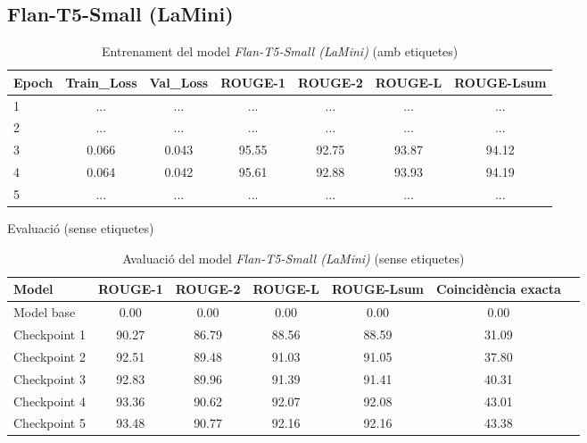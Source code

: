 \subsection{Flan-T5-Small (LaMini)}
\begin{table}[H]
    \centering
    \begin{tabular}{lcccccc}
    \toprule
    Epoch & Train\_Loss & Val\_Loss & ROUGE-1 & ROUGE-2 & ROUGE-L & ROUGE-Lsum \\
    \midrule
    1 & ... & ... & ... & ... & ... & ... \\
    2 & ... & ... & ... & ... & ... & ... \\
    3 & 0.066 & 0.043 & 95.55 & 92.75 & 93.87 & 94.12 \\
    4 & 0.064 & 0.042 & 95.61 & 92.88 & 93.93 & 94.19 \\
    5 & ... & ... & ... & ... & ... & ... \\
    \bottomrule
    \end{tabular}
    \caption[Entrenament del model \textit{Flan-T5-Small (LaMini)}]{Entrenament del model \textit{Flan-T5-Small (LaMini)} (amb etiquetes)}
\end{table}

\begin{table}[H]
    \centering
    \caption{Evaluació (sense etiquetes)}
    \begin{tabular}{lcccccc}
    \toprule
    Model & ROUGE-1 & ROUGE-2 & ROUGE-L & ROUGE-Lsum & Coincidència exacta \\
    \midrule
    Model base & 0.00 & 0.00 & 0.00 & 0.00 & 0.00 \\
    Checkpoint 1 & 90.27 & 86.79 & 88.56 & 88.59 & 31.09 \\
    Checkpoint 2 & 92.51 & 89.48 & 91.03 & 91.05 & 37.80 \\
    Checkpoint 3 & 92.83 & 89.96 & 91.39 & 91.41 & 40.31 \\
    Checkpoint 4 & 93.36 & 90.62 & 92.07 & 92.08 & 43.01 \\
    Checkpoint 5 & 93.48 & 90.77 & 92.16 & 92.16 & 43.38 \\
    \bottomrule
    \end{tabular}
    \caption[Avaluació del model \textit{Flan-T5-Small (LaMini)}]{Avaluació del model \textit{Flan-T5-Small (LaMini)} (sense etiquetes)}
\end{table}





